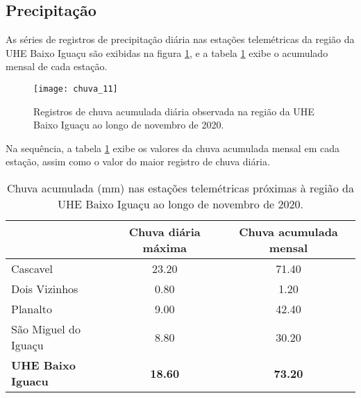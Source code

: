 \documentclass[a4paper,12pt]{article}
\begin{document}
\newpage


                   \subsection{Precipitação}
                   \hspace{0.5cm} As séries de registros de precipitação diária nas estações telemétricas da região da UHE Baixo Iguaçu são exibidas na figura \ref{fig:figchuva}, e a
                   tabela \ref{tab:tabchuva} exibe o acumulado mensal de cada estação.

    \begin{figure}[!htb]
    \texttt{[image: chuva\_11]}
    \caption{Registros de chuva acumulada diária observada na região da UHE Baixo Iguaçu ao longo de novembro de 2020.}
    \label{fig:figchuva}
    \end{figure}
    
    Na sequência, a tabela \ref{tab:tabchuva} exibe os valores da chuva acumulada mensal em cada estação, 
    assim como o valor do maior registro de chuva diária.
    
    \begin{table}[!htb]
    \centering
    \caption{Chuva acumulada (mm) nas estações telemétricas próximas à região da UHE Baixo Iguaçu ao longo de novembro de 2020.}
    \label{tab:tabchuva}
    \begin{tabular}{lcc}
    \hline
                           & Chuva diária máxima      &   Chuva acumulada mensal \\
    \hline
      Cascavel                   &  23.20                   &   71.40    \\
      Dois Vizinhos                   &  0.80                   &   1.20    \\
      Planalto                   &  9.00                   &   42.40    \\
      São Miguel do Iguaçu                   &  8.80                   &   30.20    \\
      \textbf{UHE Baixo Iguacu}                   &  \textbf{18.60}                   &   \textbf{73.20}     \\
    \hline
    \end{tabular}
    \end{table}
        
\end{document}
